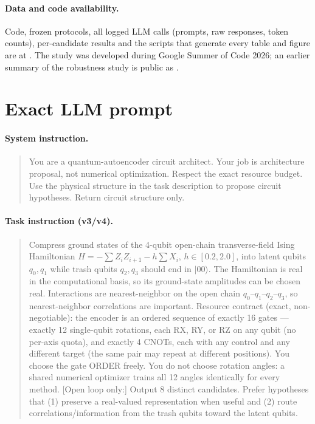 \documentclass[11pt]{article}
\begin{document}
\paragraph{Data and code availability.}
Code, frozen protocols, all logged LLM calls (prompts, raw responses, token counts),
per-candidate results and the scripts that generate every table and figure are at
\cite{llmvqc2026code}. The study was developed during Google Summer of Code 2026; an
earlier summary of the robustness study is public as \cite{hatanaka2026gsoc}.




\appendix
\section{Exact LLM prompt}
\label{app:prompt}

\paragraph{System instruction.}
\begin{quote}
You are a quantum-autoencoder circuit architect. Your job is architecture proposal, not numerical optimization. Respect the exact resource budget. Use the physical structure in the task description to propose circuit hypotheses. Return circuit structure only.
\end{quote}

\paragraph{Task instruction (v3/v4).}
\begin{quote}
Compress ground states of the 4-qubit open-chain transverse-field Ising Hamiltonian
$H=-\sum Z_iZ_{i+1}-h\sum X_i$, $h\in[0.2,2.0]$, into latent qubits $q_0,q_1$ while trash qubits $q_2,q_3$ should end in $\lvert00\rangle$.
The Hamiltonian is real in the computational basis, so its ground-state amplitudes can be chosen real.
Interactions are nearest-neighbor on the open chain $q_0$--$q_1$--$q_2$--$q_3$, so nearest-neighbor correlations are important.
Resource contract (exact, non-negotiable): the encoder is an ordered sequence of exactly 16 gates --- exactly 12 single-qubit rotations, each RX, RY, or RZ on any qubit (no per-axis quota), and exactly 4 CNOTs, each with any control and any different target (the same pair may repeat at different positions).
You choose the gate ORDER freely.
You do not choose rotation angles: a shared numerical optimizer trains all 12 angles identically for every method.
[Open loop only:] Output 8 distinct candidates.
Prefer hypotheses that (1) preserve a real-valued representation when useful and (2) route correlations/information from the trash qubits toward the latent qubits.
\end{quote}
\end{document}
